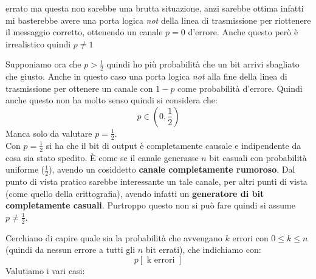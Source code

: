 \documentclass[a4paper,12pt, oneside]{book}
\begin{document}
\begin{definizione}
\begin{itemize}
    errato ma questa non sarebbe una brutta situazione, anzi sarebbe ottima
    infatti mi basterebbe avere una porta logica \textit{not} della linea di
    trasmissione per riottenere il messaggio corretto, ottenendo un canale $p=0$
    d'errore. Anche questo però è irrealistico quindi $p\neq 1$ 
  \end{itemize}
  Supponiamo ora che $p>\frac{1}{2}$ quindi ho più probabilità che un bit arrivi
  sbagliato che giusto. Anche in questo caso una porta logica \textit{not} alla
  fine della linea di trasmissione per ottenere un canale con $1-p$ come
  probabilità d'errore. Quindi anche questo non ha molto senso quindi si
  considera che:
  \[p\in(0,\frac{1}{2})\]
  Manca solo da valutare $p=\frac{1}{2}$. \\
  Con $p=\frac{1}{2}$ si ha che il bit
  di output è completamente causale e indipendente da cosa sia stato spedito. È
  come se il canale generasse $n$ bit casuali con probabilità uniforme
  ($\frac{1}{2}$), avendo un cosiddetto \textbf{canale completamente
    rumoroso}. Dal punto di vista pratico sarebbe interessante un tale canale,
  per altri punti di vista (come quello della crittografia), avendo infatti un
  \textbf{generatore di bit completamente casuali}. Purtroppo questo non si può
  fare quindi si assume $p\neq \frac{1}{2}$.
\end{definizione}
Cerchiano di capire quale sia la probabilità che avvengano $k$ errori con $0\leq
k\leq n$ (quindi da nessun errore a tutti gli $n$ bit errati), che indichiamo
con: 
\[p[\mbox{ k errori }]\]
Valutiamo i vari casi:
\end{document}
